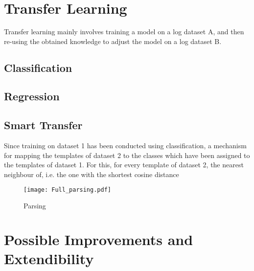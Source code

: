 \section{Transfer Learning \label{sec:transferlearning}}
Transfer learning mainly involves training a model on a log dataset A, and then re-using the obtained knowledge to adjust the model on a log dataset B. 

\subsection{Classification \label{sec:transfer_classification}}

\subsection{Regression \label{sec:transfer_regression}}

\subsection{Smart Transfer}
Since training on dataset 1 has been conducted using classification, a mechanism for mapping the templates of dataset 2 to the classes which have been assigned to the templates of dataset 1. For this, for every template of dataset 2, the nearest neighbour of, i.e. the one with the shortest cosine distance 


\begin{figure}[htb]
  \centering
  \texttt{[image: Full\_parsing.pdf]}\\
  \caption{Parsing }
  \label{fig:Full pre-processing workflow}
\end{figure}


\section{Possible Improvements and Extendibility\label{sec:improvements}}


